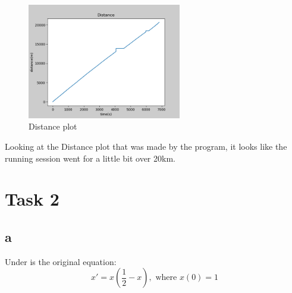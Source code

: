\documentclass{article}
\begin{document}
\begin{figure}[h]
    \centering
    \includegraphics[width=0.6\textwidth]{Distance}
    \caption{Distance plot}
    \label{fig:dist}
\end{figure}

Looking at the Distance plot that was made by the program, it looks like the running session went for a little
bit over 20km.

\newpage

\section*{Task 2}

\subsection*{a}

Under is the original equation:
\begin{equation}
    x' = x(\frac{1}{2} - x), \text{ where } x(0) = 1
\end{equation}
\end{document}
